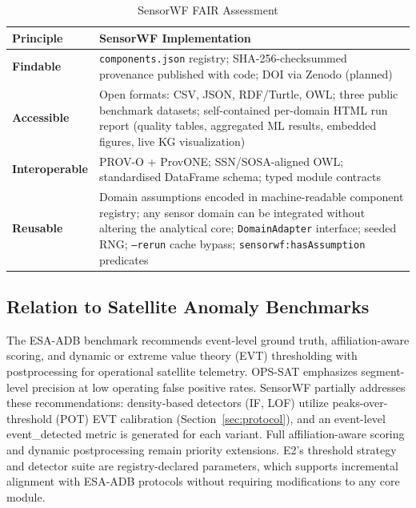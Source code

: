 \documentclass[conference]{IEEEtran}
\begin{document}
\begin{table}[t]
\caption{SensorWF FAIR Assessment}
\label{tab:fair}
\centering
\scriptsize
\setlength{\tabcolsep}{3pt}
\begin{tabular}{@{}lp{5.4cm}@{}}
\toprule
\textbf{Principle} & \textbf{SensorWF Implementation} \\
\midrule
\textbf{Findable}      & \texttt{components.json} registry; SHA-256-checksummed provenance published with code; DOI via Zenodo (planned) \\
\textbf{Accessible}    & Open formats: CSV, JSON, RDF/Turtle, OWL; three public benchmark datasets; self-contained per-domain HTML run report (quality tables, aggregated ML results, embedded figures, live KG visualization) \\
\textbf{Interoperable} & PROV-O + ProvONE; SSN/SOSA-aligned OWL; standardised DataFrame schema; typed module contracts \\
\textbf{Reusable}      & Domain assumptions encoded in machine-readable component registry; any sensor domain can be integrated without altering the analytical core; \texttt{DomainAdapter} interface; seeded RNG; \texttt{--rerun} cache bypass; \texttt{sensorwf:hasAssumption} predicates \\
\bottomrule
\end{tabular}
\end{table}

\subsection{Relation to Satellite Anomaly Benchmarks}

The ESA-ADB benchmark \cite{esa_adb2024} recommends event-level ground truth, affiliation-aware scoring, and dynamic or extreme value theory (EVT) thresholding with postprocessing for operational satellite telemetry. OPS-SAT \cite{ruszczak2025opssat} emphasizes segment-level precision at low operating false positive rates. SensorWF partially addresses these recommendations: density-based detectors (IF, LOF) utilize peaks-over-threshold (POT) EVT calibration (Section~\ref{sec:protocol}), and an event-level event_detected metric is generated for each variant. Full affiliation-aware scoring and dynamic postprocessing remain priority extensions. E2's threshold strategy and detector suite are registry-declared parameters, which supports incremental alignment with ESA-ADB protocols without requiring modifications to any core module.


\end{document}
